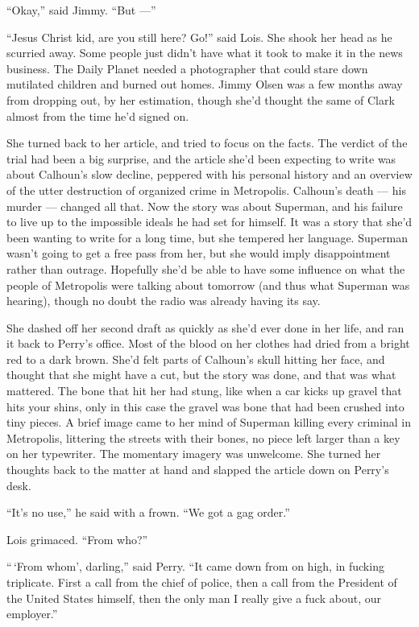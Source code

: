 ``Okay,'' said Jimmy. ``But ---''

``Jesus Christ kid, are you still here? Go!'' said Lois. She shook her
head as he scurried away. Some people just didn't have what it took to
make it in the news business. The Daily Planet needed a photographer
that could stare down mutilated children and burned out homes. Jimmy
Olsen was a few months away from dropping out, by her estimation, though
she'd thought the same of Clark almost from the time he'd signed on.

She turned back to her article, and tried to focus on the facts. The
verdict of the trial had been a big surprise, and the article she'd been
expecting to write was about Calhoun's slow decline, peppered with his
personal history and an overview of the utter destruction of organized
crime in Metropolis. Calhoun's death --- his murder --- changed all
that. Now the story was about Superman, and his failure to live up to
the impossible ideals he had set for himself. It was a story that she'd
been wanting to write for a long time, but she tempered her language.
Superman wasn't going to get a free pass from her, but she would imply
disappointment rather than outrage. Hopefully she'd be able to have some
influence on what the people of Metropolis were talking about tomorrow
(and thus what Superman was hearing), though no doubt the radio was
already having its say.

She dashed off her second draft as quickly as she'd ever done in her
life, and ran it back to Perry's office. Most of the blood on her
clothes had dried from a bright red to a dark brown. She'd felt parts of
Calhoun's skull hitting her face, and thought that she might have a cut,
but the story was done, and that was what mattered. The bone that hit
her had stung, like when a car kicks up gravel that hits your shins,
only in this case the gravel was bone that had been crushed into tiny
pieces. A brief image came to her mind of Superman killing every
criminal in Metropolis, littering the streets with their bones, no piece
left larger than a key on her typewriter. The momentary imagery was
unwelcome. She turned her thoughts back to the matter at hand and
slapped the article down on Perry's desk.

``It's no use,'' he said with a frown. ``We got a gag order.''

Lois grimaced. ``From who?''

``\,`From whom', darling,'' said Perry. ``It came down from on high, in
fucking triplicate. First a call from the chief of police, then a call
from the President of the United States himself, then the only man I
really give a fuck about, our employer.''

